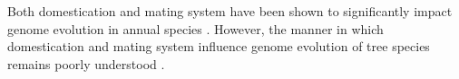 \documentclass[12pt]{article}
\begin{document}
%
%
Both domestication and mating system have been shown to significantly impact genome evolution in annual species \citep{glemin2006impact, doebley2006molecular, slotte2013capsella}. 
%
However, the manner in which domestication and mating system influence genome evolution of tree species remains poorly understood \citep{mckey2010evolutionary}.
\\
\\
%
%
%
%
%
%
\end{document}
